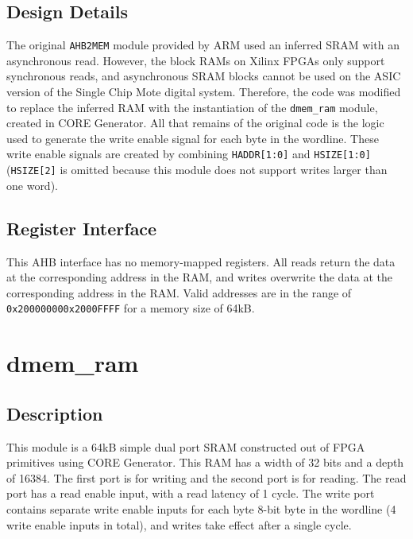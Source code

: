 \subsection{Design Details}
The original \texttt{AHB2MEM} module provided by ARM used an inferred SRAM with an asynchronous read. However, the block RAMs on Xilinx FPGAs only support synchronous reads, and asynchronous SRAM blocks cannot be used on the ASIC version of the Single Chip Mote digital system. Therefore, the code was modified to replace the inferred RAM with the instantiation of the \texttt{dmem\_ram} module, created in CORE Generator. All that remains of the original code is the logic used to generate the write enable signal for each byte in the wordline. These write enable signals are created by combining \texttt{HADDR[1:0]} and \texttt{HSIZE[1:0]} (\texttt{HSIZE[2]} is omitted because this module does not support writes larger than one word).

\subsection{Register Interface}
This AHB interface has no memory-mapped registers. All reads return the data at the corresponding address in the RAM, and writes overwrite the data at the corresponding address in the RAM. Valid addresses are in the range of \texttt{0x20000000\-0x2000FFFF} for a memory size of 64kB.

\section{dmem\_ram}
\subsection{Description}
This module is a 64kB simple dual port SRAM constructed out of FPGA primitives using CORE Generator. This RAM has a width of 32 bits and a depth of 16384. The first port is for writing and the second port is for reading. The read port has a read enable input, with a read latency of 1 cycle. The write port contains separate write enable inputs for each byte 8-bit byte in the wordline (4 write enable inputs in total), and writes take effect after a single cycle.

